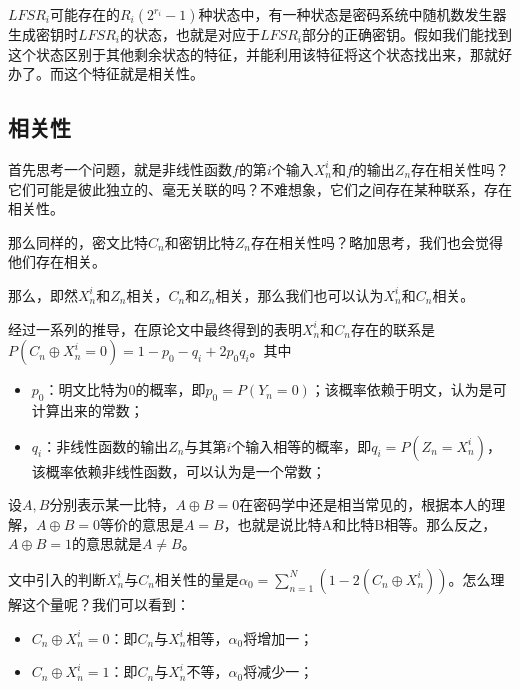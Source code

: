 \documentclass{article}
\begin{document}
$LFSR_i$可能存在的$R_i(2^{r_i}-1)$种状态中，有一种状态是密码系统中随机数发生器生成密钥时$LFSR_i$的状态，也就是对应于$LFSR_i$部分的正确密钥。假如我们能找到这个状态区别于其他剩余状态的特征，并能利用该特征将这个状态找出来，那就好办了。而这个特征就是相关性。


\subsection*{相关性}
首先思考一个问题，就是非线性函数$f$的第$i$个输入$X_n^i$和$f$的输出$Z_n$存在相关性吗？它们可能是彼此独立的、毫无关联的吗？不难想象，它们之间存在某种联系，存在相关性。

那么同样的，密文比特$C_n$和密钥比特$Z_n$存在相关性吗？略加思考，我们也会觉得他们存在相关。

那么，即然$X_n^i$和$Z_n$相关，$C_n$和$Z_n$相关，那么我们也可以认为$X_n^i$和$C_n$相关。

经过一系列的推导，在原论文中最终得到的表明$X_n^i$和$C_n$存在的联系是
$P(C_n \oplus X_n^i = 0) = 1 - p_0 - q_i + 2p_0q_i$。其中
\begin{itemize}
	\item 
	$p_0$：明文比特为0的概率，即$p_0=P(Y_n=0)$；该概率依赖于明文，认为是可计算出来的常数；
	\item
	$q_i$：非线性函数的输出$Z_n$与其第$i$个输入相等的概率，即$q_i=P(Z_n=X_n^i)$，该概率依赖非线性函数，可以认为是一个常数；
\end{itemize}

设$A,B$分别表示某一比特，$A\oplus B=0$在密码学中还是相当常见的，根据本人的理解，$A\oplus B=0$等价的意思是$A=B$，也就是说比特A和比特B相等。那么反之，$A \oplus B = 1$的意思就是$A\neq B$。

文中引入的判断$X_n^i$与$C_n$相关性的量是$\alpha_0=\sum_{n=1}^{N}(1-2(C_n \oplus X_n^i))$。怎么理解这个量呢？我们可以看到：
\begin{itemize}
	\item 
	$C_n \oplus X_n^i = 0$：即$C_n$与$X_n^i$相等，$\alpha_0$将增加一；
	\item
	$C_n \oplus X_n^i = 1$：即$C_n$与$X_n^i$不等，$\alpha_0$将减少一；
\end{itemize}
\end{document}
